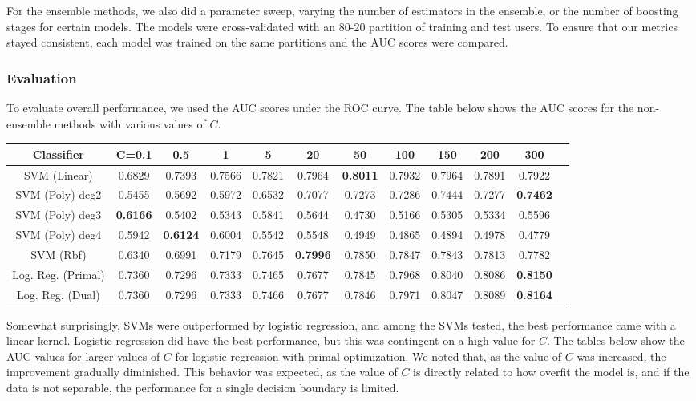 \documentclass{article} %
\begin{document}
For the ensemble methods, we also did a parameter sweep, varying the number of
estimators in the ensemble, or the number of boosting stages for certain models.
The models were cross-validated with an 80-20 partition of training and test
users. To ensure that our metrics stayed consistent, each model was trained on
the same partitions and the AUC scores were compared.

\subsubsection{Evaluation}

To evaluate overall performance, we used the AUC scores under the ROC curve.
The table below shows the AUC scores for the non-ensemble methods with various values of $C$.

\begin{adjustbox}{width=\textwidth,totalheight=\textheight,keepaspectratio}
\begin{tabular}{c|ccccccccccc}
Classifier & C=0.1 & 0.5 & 1 & 5 & 20 & 50 & 100 & 150 & 200 & 300\\
\hline
SVM (Linear) & 0.6829 & 0.7393 & 0.7566 & 0.7821 & 0.7964 & \textbf{0.8011} & 0.7932 & 0.7964 & 0.7891 & 0.7922\\
SVM (Poly) deg2 & 0.5455 & 0.5692 & 0.5972 & 0.6532 & 0.7077 & 0.7273 & 0.7286 & 0.7444 & 0.7277 & \textbf{0.7462}\\
SVM (Poly) deg3 & \textbf{0.6166} & 0.5402 & 0.5343 & 0.5841 & 0.5644 & 0.4730 & 0.5166 & 0.5305 & 0.5334 & 0.5596\\
SVM (Poly) deg4 & 0.5942 & \textbf{0.6124} & 0.6004 & 0.5542 & 0.5548 & 0.4949 & 0.4865 & 0.4894 & 0.4978 & 0.4779\\
SVM (Rbf) & 0.6340 & 0.6991 & 0.7179 & 0.7645 & \textbf{0.7996} & 0.7850 & 0.7847 & 0.7843 & 0.7813 & 0.7782\\
Log. Reg. (Primal) & 0.7360 & 0.7296 & 0.7333 & 0.7465 & 0.7677 & 0.7845 & 0.7968 & 0.8040 & 0.8086 & \textbf{0.8150}\\
Log. Reg. (Dual) & 0.7360 & 0.7296 & 0.7333 & 0.7466 & 0.7677 & 0.7846 & 0.7971 & 0.8047 & 0.8089 & \textbf{0.8164}\\
\end{tabular}
\end{adjustbox}

Somewhat surprisingly, SVMs were outperformed by logistic regression, and among
the SVMs tested, the best performance came with a linear kernel. Logistic
regression did have the best performance, but this was contingent on a high
value for $C$. The tables below show the AUC values for larger values of $C$ for
logistic regression with primal optimization. We noted that, as the value of $C$
was increased, the improvement gradually diminished. This behavior was expected,
as the value of $C$ is directly related to how overfit the model is, and if the
data is not separable, the performance for a single decision boundary is
limited.
\end{document}
